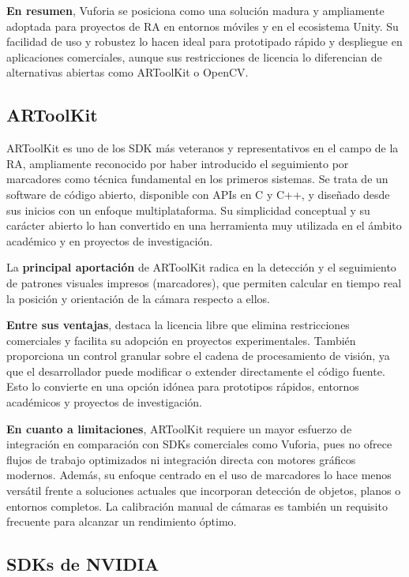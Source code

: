 \textbf{En resumen}, Vuforia se posiciona como una solución madura y ampliamente adoptada para proyectos de RA en entornos móviles y en el ecosistema Unity. Su facilidad de uso y robustez lo hacen ideal para prototipado rápido y despliegue en aplicaciones comerciales, aunque sus restricciones de licencia lo diferencian de alternativas abiertas como ARToolKit o OpenCV.

\subsection{ARToolKit}
\label{subsec:artoolkit}

ARToolKit \citep{ARToolkit} es uno de los SDK más veteranos y representativos en el campo de la RA, ampliamente reconocido por haber introducido el seguimiento por marcadores como técnica fundamental en los primeros sistemas. Se trata de un software de código abierto, disponible con APIs en C y C++, y diseñado desde sus inicios con un enfoque multiplataforma. Su simplicidad conceptual y su carácter abierto lo han convertido en una herramienta muy utilizada en el ámbito académico y en proyectos de investigación.

La \textbf{principal aportación} de ARToolKit radica en la detección y el seguimiento de patrones visuales impresos (marcadores), que permiten calcular en tiempo real la posición y orientación de la cámara respecto a ellos.

\textbf{Entre sus ventajas}, destaca la licencia libre que elimina restricciones comerciales y facilita su adopción en proyectos experimentales. También proporciona un control granular sobre el cadena de procesamiento de visión, ya que el desarrollador puede modificar o extender directamente el código fuente. Esto lo convierte en una opción idónea para prototipos rápidos, entornos académicos y proyectos de investigación.

\textbf{En cuanto a limitaciones}, ARToolKit requiere un mayor esfuerzo de integración en comparación con SDKs comerciales como Vuforia, pues no ofrece flujos de trabajo optimizados ni integración directa con motores gráficos modernos. Además, su enfoque centrado en el uso de marcadores lo hace menos versátil frente a soluciones actuales que incorporan detección de objetos, planos o entornos completos. La calibración manual de cámaras es también un requisito frecuente para alcanzar un rendimiento óptimo.

\subsection{SDKs de NVIDIA}
\label{subsec:nvidia_sdk}

